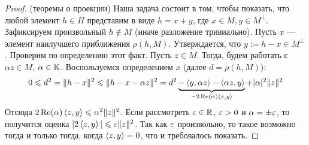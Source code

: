 \begin{proof} (теоремы о проекции)
	Наша задача состоит в том, чтобы показать, что любой элемент $h \in H$ представим в виде $h = x + y$, где $x \in M, y \in M^\bot$. Зафиксируем произвольный $h \notin M$ (иначе разложение тривиально). Пусть $x$ --- элемент наилучшего приближения $\rho(h, M)$.  Утверждается, что $y := h - x \in M^\bot$. Проверим по определению этот факт. Пусть $z \in M$. Тогда, будем работать с $\alpha z \in M$, $\alpha \in \mathbb{K}$. Воспользуемся определением $x$ (далее $d = \rho(h, M)$):
	\[
		0 \leqslant d^2 = \|h - x\|^2 \leqslant \|h - x - \alpha z\|^2 = d^2\underbrace{ - \left\langle y, \alpha z\right\rangle - \left\langle\alpha z, y\right\rangle}_{-2\operatorname{Re}(\alpha)\left\langle z, y\right\rangle} + |\alpha|^2\|z\|^2
	\]
	Отсюда $2\operatorname{Re}(\alpha) \left\langle z, y\right\rangle \leqslant \alpha^2\|z\|^2$. Если рассмотреть $\varepsilon \in \mathbb{R}$, $\varepsilon > 0$ и $\alpha = \pm \varepsilon$, то получится оценка $|2 \left\langle z, y\right\rangle| \leqslant \varepsilon \|z\|^2$. Так как $\varepsilon$ произвольно, то такое возможно тогда и только тогда, когда $\left\langle z, y\right\rangle = 0$, что и требовалось показать.
\end{proof}